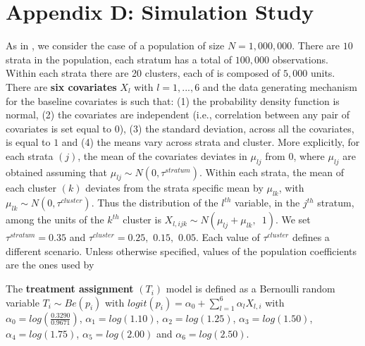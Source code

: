 \documentclass[oupdraft]{bio}
\begin{document}
\section*{Appendix D: Simulation Study}
As in \citet{austin2016propensity}, we consider the case of a population of size $N=1,000,000$. There are $10$ strata in the population, each stratum has a total of $100,000$ observations. Within each strata there are 20 clusters, each of is composed of $5,000$ units. There are \textbf{six covariates} $X_{l}$ with $l=1,...,6$ and the data generating mechanism for the baseline covariates is such that: (1) the probability density function is normal, (2) the covariates are independent (i.e., correlation between any pair of covariates is set equal to $0$), (3) the standard deviation, across all the covariates, is equal to $1$ and (4) the means vary across strata and cluster. More explicitly, for each strata $\left(j\right)$, the mean of the covariates deviates in $\mu_{lj}$ from $0$, where $\mu_{lj}$ are obtained assuming that $\mu_{lj}\sim N\left(0,\tau^{stratum}\right)$. Within each strata, the mean of each cluster $\left(k\right)$ deviates from the strata specific mean by $\mu_{lk}$, with $\mu_{lk}\sim N\left(0,\tau^{cluster}\right)$.
Thus the distribution of the $l^{th}$ variable, in the $j^{th}$ stratum, among the units of the $k^{th}$ cluster is $X_{l,ijk}\sim N\left(\mu_{lj}+\mu_{lk},\,\,\,1\right)$.
We set $\tau^{stratum}=0.35$ and $\tau^{cluster}=0.25,\,\,0.15,\,\,0.05$. Each value of $\tau^{cluster}$ defines a different scenario. Unless otherwise specified, values of the population coefficients are the ones used by \citet{austin2016propensity} 

The \textbf{treatment assignment} $\left(T_{i}\right)$ model is defined as
a Bernoulli random variable $T_{i}\sim Be\left(p_{i}\right)$ with $logit\left(p_{i}\right)=\alpha_{0}+\sum_{l=1}^{6}\alpha_{l}X_{l,i}$ with $\alpha_{0}=log\left(\frac{0.3290}{0.9671}\right)$, $\alpha_{1}=log(1.10)$,
$\alpha_{2}=log(1.25)$, $\alpha_{3}=log(1.50)$, $\alpha_{4}=log(1.75)$,
$\alpha_{5}=log(2.00)$ and $\alpha_{6}=log(2.50)$. 
\end{document}
